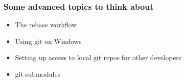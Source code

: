\documentclass{beamer}%
\begin{document}

\begin{frame}
	\frametitle{Some advanced topics to think about}
	
	\begin{itemize}
		\item The rebase workflow
		\item Using git on Windows
		\item Setting up access to local git repos for other developers
		\item git submodules
	\end{itemize}
	
\end{frame}

\end{document}
